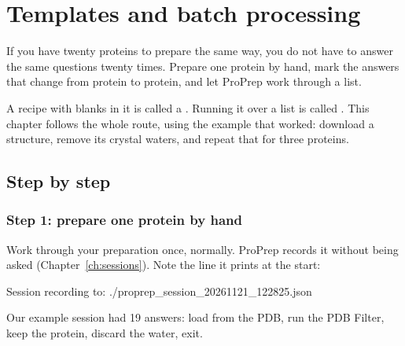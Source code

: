 \chapter{Templates and batch processing}
\label{ch:batch}

If you have twenty proteins to prepare the same way, you do not have to answer
the same questions twenty times. Prepare one protein by hand, mark the answers
that change from protein to protein, and let ProPrep work through a list.

A recipe with blanks in it is called a . Running it over a list
is called . This chapter follows the whole route, using
the example that worked: download a structure, remove its crystal waters, and
repeat that for three proteins.

\begin{glance}
\end{glance}

\section{Step by step}

\subsection{Step 1: prepare one protein by hand}

Work through your preparation once, normally. ProPrep records it without being
asked (Chapter~\ref{ch:sessions}). Note the line it prints at the start:

\begin{screen}
Session recording to: ./proprep_session_20261121_122825.json
\end{screen}

Our example session had 19 answers: load  from the PDB, run the PDB
Filter, keep the protein, discard the water, exit.

